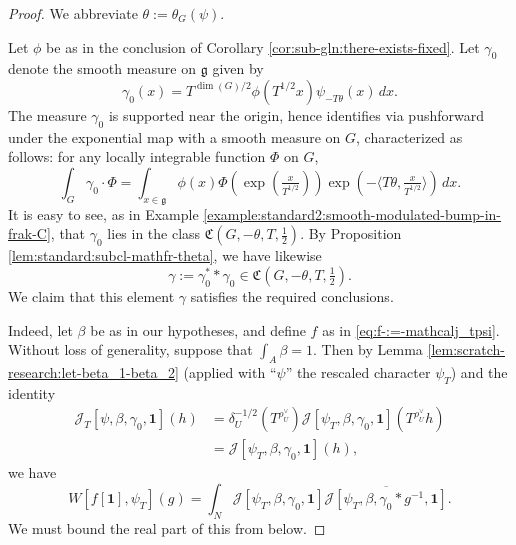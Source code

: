 \documentclass[reqno]{amsart}
\theoremstyle{plain} \newtheorem{theorem} {Theorem}
\theoremstyle{definition} \newtheorem{definition} [theorem] {Definition}
\theoremstyle{itplain} %
\numberwithin{equation}{section}
\numberwithin{theorem}{section}
\begin{document}
\begin{proof}
  We abbreviate $\theta := \theta_G(\psi)$.
  
  Let $\phi$ be as in the conclusion of Corollary \ref{cor:sub-gln:there-exists-fixed}.  Let $\gamma_0$ denote the smooth measure on $\mathfrak{g}$ given by
  \begin{equation*}
    \gamma_0(x) = T^{\dim(G)/2} \phi(T^{1/2} x) \psi_{- T \theta}(x) \, d x.
  \end{equation*}
  The measure $\gamma_0$ is supported near the origin, hence identifies via pushforward under the exponential map with a smooth measure on $G$, characterized as follows: for any locally integrable function $\Phi$ on $G$,
  \begin{equation}\label{eq:int-_g-gamma_0}
    \int _{G} \gamma_0 \cdot \Phi
    = \int _{x \in \mathfrak{g} }
    \phi(x)
    \Phi (\exp (\tfrac{x}{T ^{1/2} }))
    \exp (- \langle T \theta, \tfrac{x}{ T ^{1/2} } \rangle)
    \, d x.
  \end{equation}
  It is easy to see, as in Example \ref{example:standard2:smooth-modulated-bump-in-frak-C}, that $\gamma_0$ lies in the class $\mathfrak{C}(G,-\theta,T,\tfrac{1}{2})$.  By Proposition \ref{lem:standard:subcl-mathfr-theta}, we have likewise
  \begin{equation*}
\gamma := \gamma_0^* \ast \gamma_0 \in \mathfrak{C}(G,-\theta,T,\tfrac{1}{2}).
\end{equation*}
We claim that this element $\gamma$ satisfies the required conclusions.

Indeed, let $\beta$ be as in our hypotheses, and define $f$ as in \eqref{eq:f-:=-mathcalj_tpsi}.  Without loss of generality, suppose that $\int_{A} \beta = 1$.  Then by Lemma \ref{lem:scratch-research:let-beta_1-beta_2} (applied with ``$\psi$'' the rescaled character $\psi_T$) and the identity
\begin{align*}
  \mathcal{J}_T[\psi,\beta,\gamma_0,\mathbf{1}](h)
  &=
    \delta_U^{-1/2} (T^{\rho_U^\vee}) \mathcal{J}[\psi_T,\beta,\gamma_0, \mathbf{1}](T^{\rho_U^\vee} h)
  \\
  &=
    \mathcal{J}[\psi_T,\beta,\gamma_0,\mathbf{1}](h),
\end{align*}
we have
\begin{equation}\label{eq:whittaker-evaluate-at-1-via-integral-distributions-convolved-appl}
  W[f[\mathbf{1}], \psi_T](g) = \int_N \mathcal{J}[\psi_T, \beta, \gamma_0,\mathbf{1}] \overline{\mathcal{J}[\psi_T, \beta, \gamma_0 \ast g^{-1},\mathbf{1}]}.
\end{equation}
We must bound the real part of this from below.


\end{proof}
\end{document}
